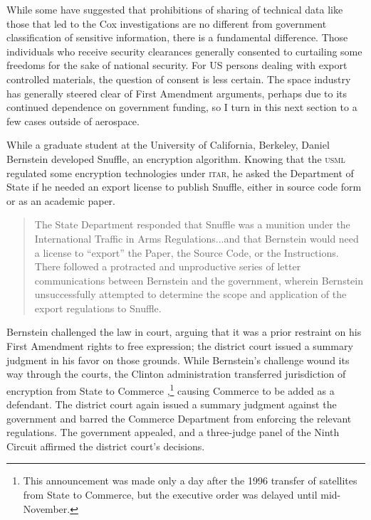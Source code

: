 \documentclass[12pt]{olfmemo}
\begin{document}
While some have suggested that prohibitions of sharing of technical data like those that led to the Cox investigations are no different from government classification of sensitive information, there is a fundamental difference. Those individuals who receive security clearances generally consented to curtailing some freedoms for the sake of national security. For US persons dealing with export controlled materials, the question of consent is less certain. The space industry has generally steered clear of First Amendment arguments, perhaps due to its continued dependence on government funding, so I turn in this next section to a few cases outside of aerospace.

While a graduate student at the University of California, Berkeley, Daniel Bernstein developed Snuffle, an encryption algorithm. Knowing that the \textsc{usml} regulated some encryption technologies under \textsc{itar}, he asked the Department of State if he needed an export license to publish Snuffle, either in source code form or as an academic paper.
\begin{quote}
The State Department responded that Snuffle was a munition under the International Traffic in Arms Regulations...and that Bernstein would need a license to ``export'' the Paper, the Source Code, or the Instructions. There followed a protracted and unproductive series of letter communications between Bernstein and the government, wherein Bernstein unsuccessfully attempted to determine the scope and application of the export regulations to Snuffle. \citep{Bernstein1997}
\end{quote}
%
Bernstein challenged the law in court, arguing that it was a prior restraint on his First Amendment rights to free expression\citep{Bernstein1997}; the district court issued a summary judgment in his favor on those grounds. While Bernstein's challenge wound its way through the courts, the Clinton administration transferred jurisdiction of encryption from State to Commerce \citep{ExecOrder13026_1996},\footnote{This announcement was made only a day after the 1996 transfer of satellites from State to Commerce, but the executive order was delayed until mid-November.} causing Commerce to be added as a defendant. The district court again issued a summary judgment against the government and barred the Commerce Department from enforcing the relevant regulations. The government appealed, and a three-judge panel of the Ninth Circuit affirmed the district court's decisions.
\end{document}
